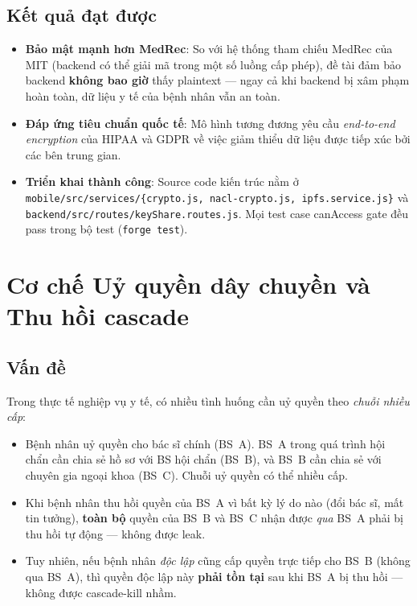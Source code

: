 \documentclass[../DoAn]{subfiles}
\begin{document}
\subsection{Kết quả đạt được}

\begin{itemize}
    \item \textbf{Bảo mật mạnh hơn MedRec}: So với hệ thống tham chiếu MedRec của MIT \cite{azaria2016medrec} (backend có thể giải mã trong một số luồng cấp phép), đề tài đảm bảo backend \textbf{không bao giờ} thấy plaintext --- ngay cả khi backend bị xâm phạm hoàn toàn, dữ liệu y tế của bệnh nhân vẫn an toàn.
    \item \textbf{Đáp ứng tiêu chuẩn quốc tế}: Mô hình tương đương yêu cầu \textit{end-to-end encryption} của HIPAA \cite{hipaa1996} và GDPR \cite{gdpr2016} về việc giảm thiểu dữ liệu được tiếp xúc bởi các bên trung gian.
    \item \textbf{Triển khai thành công}: Source code kiến trúc nằm ở \texttt{mobile/src/services/\{crypto.js, nacl-crypto.js, ipfs.service.js\}} và \texttt{backend/src/routes/keyShare.routes.js}. Mọi test case canAccess gate đều pass trong bộ test (\texttt{forge test}).
\end{itemize}

\section{Cơ chế Uỷ quyền dây chuyền và Thu hồi cascade}

\subsection{Vấn đề}

Trong thực tế nghiệp vụ y tế, có nhiều tình huống cần uỷ quyền theo \textit{chuỗi nhiều cấp}:

\begin{itemize}
    \item Bệnh nhân uỷ quyền cho bác sĩ chính (BS~A). BS~A trong quá trình hội chẩn cần chia sẻ hồ sơ với BS hội chẩn (BS~B), và BS~B cần chia sẻ với chuyên gia ngoại khoa (BS~C). Chuỗi uỷ quyền có thể nhiều cấp.
    \item Khi bệnh nhân thu hồi quyền của BS~A vì bất kỳ lý do nào (đổi bác sĩ, mất tin tưởng), \textbf{toàn bộ} quyền của BS~B và BS~C nhận được \textit{qua} BS~A phải bị thu hồi tự động --- không được leak.
    \item Tuy nhiên, nếu bệnh nhân \textit{độc lập} cũng cấp quyền trực tiếp cho BS~B (không qua BS~A), thì quyền độc lập này \textbf{phải tồn tại} sau khi BS~A bị thu hồi --- không được cascade-kill nhầm.
\end{itemize}
\end{document}
